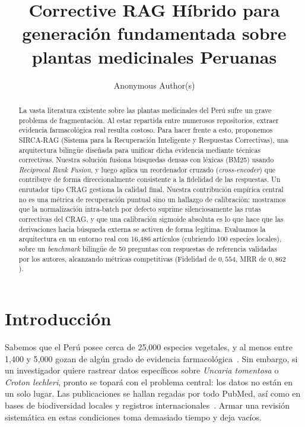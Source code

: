 \documentclass[runningheads]{llncs}
\title{Corrective RAG H\'{i}brido para generaci\'{o}n
fundamentada sobre plantas medicinales Peruanas}
\author{Anonymous Author(s)}
\institute{Affiliation withheld for double-blind review}
\newcommand{\sirca}{\textsc{SIRCA-RAG}}
\begin{document}
\sloppy
\maketitle

\begin{abstract}
La vasta literatura existente sobre las plantas medicinales del Per\'{u} sufre un grave problema de fragmentaci\'{o}n. Al estar repartida entre numerosos repositorios, extraer evidencia farmacol\'{o}gica real resulta costoso. Para hacer frente a esto, proponemos \sirca{} (Sistema para la Recuperaci\'{o}n Inteligente y Respuestas Correctivas), una arquitectura biling\"{u}e dise\~{n}ada para unificar dicha evidencia mediante t\'{e}cnicas correctivas. Nuestra soluci\'{o}n fusiona b\'{u}squedas densas con l\'{e}xicas (BM25) usando \emph{Reciprocal Rank Fusion}, y luego aplica un reordenador cruzado (\emph{cross-encoder}) que contribuye de forma direccionalmente consistente a la fidelidad de las respuestas. Un enrutador tipo CRAG gestiona la calidad final. Nuestra contribuci\'{o}n emp\'{i}rica central no es una m\'{e}trica de recuperaci\'{o}n puntual sino un hallazgo de calibraci\'{o}n: mostramos que la normalizaci\'{o}n intra-batch por defecto suprime silenciosamente las rutas correctivas del CRAG, y que una calibraci\'{o}n sigmoide absoluta es lo que hace que las derivaciones hacia b\'{u}squeda externa se activen de forma leg\'{i}tima. Evaluamos la arquitectura en un entorno real con 16{,}486 art\'{i}culos (cubriendo 100 especies locales), sobre un \emph{benchmark} biling\"{u}e de 50 preguntas con respuestas de referencia validadas por los autores, alcanzando m\'{e}tricas competitivas (Fidelidad de $0{,}554$, MRR de $0{,}862$).

\end{abstract}

\section{Introducci\'{o}n}
\label{sec:intro}

Sabemos que el Per\'{u} posee cerca de 25{,}000 especies vegetales, y al menos entre 1{,}400 y 5{,}000 gozan de alg\'{u}n grado de evidencia farmacol\'{o}gica~\cite{bussmann2006traditional,bussmann2011toxicity}. Sin embargo, si un investigador quiere rastrear datos espec\'{i}ficos sobre \textit{Uncaria tomentosa} o \textit{Croton lechleri}, pronto se topar\'{a} con el problema central: los datos no est\'{a}n en un solo lugar. Las publicaciones se hallan regadas por todo PubMed, as\'{i} como en bases de biodiversidad locales y registros internacionales~\cite{lock2016bioactive,gonzales2012ethnobiology}. Armar una revisi\'{o}n sistem\'{a}tica en estas condiciones toma demasiado tiempo y deja vac\'{i}os.
\end{document}

